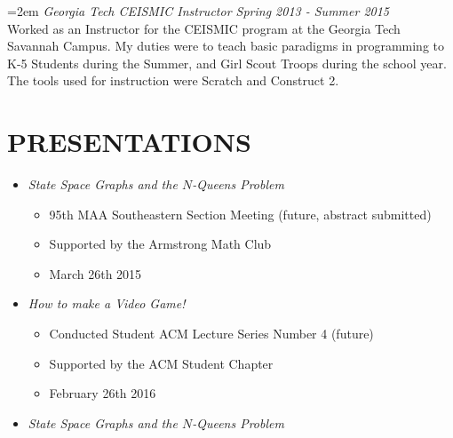 \documentclass[11pt]{article} %
\begin{document}
\hangindent=2em
\emph{Georgia Tech CEISMIC Instructor Spring 2013 - Summer 2015}\\
Worked as an Instructor for the CEISMIC program at the Georgia Tech Savannah Campus. My duties were to teach basic paradigms in programming to K-5 Students during the Summer, and Girl Scout Troops during the school year. The tools used for instruction were Scratch and Construct 2.
\section*{PRESENTATIONS}
\begin{itemize}
  \setlength{\itemsep}{1pt}
  \setlength{\parskip}{0pt}
  \setlength{\parsep}{0pt}

\item \textit{State Space Graphs and the $N$-Queens Problem} 
  \begin{itemize}
	  	\setlength{\itemsep}{1pt}
  		\setlength{\parskip}{0pt}
 	 	\setlength{\parsep}{0pt}
	\item 95th MAA Southeastern Section Meeting (future, abstract submitted)
	\item Supported by the Armstrong Math Club
	\item March 26th 2015
	\end{itemize}
	  \item \textit{How to make a Video Game!} 
  \begin{itemize}
	  	\setlength{\itemsep}{1pt}
  		\setlength{\parskip}{0pt}
 	 	\setlength{\parsep}{0pt}
		\item Conducted Student ACM Lecture Series Number 4  (future)
	\item Supported by the ACM Student Chapter
	\item February 26th 2016
	\end{itemize}
\item \textit{State Space Graphs and the $N$-Queens Problem} 


\end{itemize}
\end{document}
